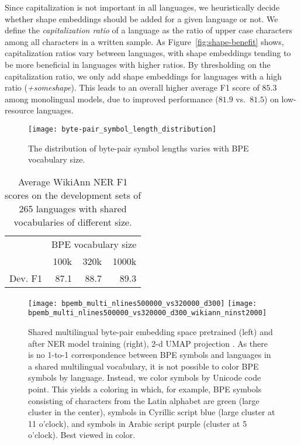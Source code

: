 \documentclass[11pt,a4paper]{article}
\begin{document}
Since capitalization is not important in all languages, we heuristically decide whether shape embeddings should be added for a given language or not.
We define the \emph{capitalization ratio} of a language as the ratio of upper case characters among all characters in a written sample.
As Figure~\ref{fig:shape-benefit} shows, capitalization ratios vary between languages, with shape embeddings tending to be more beneficial in languages with higher ratios.
By thresholding on the capitalization ratio, we only add shape embeddings for languages with a high ratio (\emph{+someshape}).
This leads to an overall higher average F1 score of $85.3$ among monolingual models, due to improved performance ($81.9$ vs.\ $81.5$) on low-resource languages.

\begin{figure}
	\texttt{[image: byte-pair\_symbol\_length\_distribution]}
	\vspace{-7mm}
	\caption{The distribution of byte-pair symbol lengths varies with BPE vocabulary size.}
	\label{fig:bpe-length}
\end{figure}

\begin{table}
	\centering
	\small
	\begin{tabular}{lrrr}
		\toprule
		 & \multicolumn{3}{c}{BPE vocabulary size} \\
		 & 100k & 320k & 1000k \\
		\midrule
Dev. F1 & 87.1 & 88.7 & 89.3 \\
		\bottomrule
	\end{tabular}
	\caption{Average WikiAnn NER F1 scores on the development sets of 265 languages with shared vocabularies of different size.}
	\label{tbl:bpe-vocab-size}
\end{table}

\begin{figure*}
	\centering
	\texttt{[image: bpemb\_multi\_nlines500000\_vs320000\_d300]}
	\qquad \qquad
	\texttt{[image: bpemb\_multi\_nlines500000\_vs320000\_d300\_wikiann\_ninst2000]}
	\vspace{-1.5ex}
	\caption{Shared multilingual byte-pair embedding space pretrained (left) and after NER model training (right), 2-d UMAP projection \citep{mcinnes2018umap}. As there is no 1-to-1 correspondence between BPE symbols and languages in a shared multilingual vocabulary, it is not possible to color BPE symbols by language.
Instead, we color symbols by Unicode code point.
This yields a coloring in which, for example, BPE symbols consisting of characters from the Latin alphabet are green (large cluster in the center), symbols in Cyrillic script blue (large cluster at 11 o'clock), and symbols in Arabic script purple (cluster at 5 o'clock). Best viewed in color.}
	\label{fig:multi-emb-training}
\end{figure*}
\end{document}
